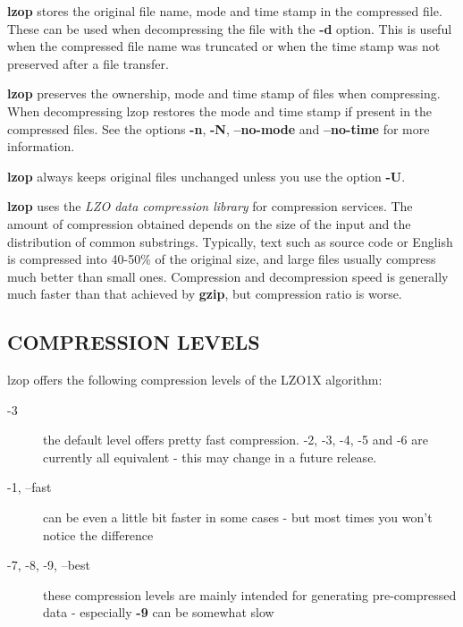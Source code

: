 \textbf{lzop} stores the original file name, mode and time stamp
in the compressed file. These can be used when
decompressing the file with the \textbf{-d} option. This is useful when
the compressed file name was truncated or when the time
stamp was not preserved after a file transfer.



\textbf{lzop} preserves the ownership, mode and time stamp of files
when compressing. When decompressing lzop restores the
mode and time stamp if present in the compressed files.
See the options \textbf{-n}, \textbf{-N}, \textbf{--no-mode} and \textbf{--no-time}
for more information.



\textbf{lzop} always keeps original files unchanged unless
you use the option \textbf{-U}.



\textbf{lzop} uses the \textit{LZO data compression library} for compression
services. The amount of compression obtained depends on
the size of the input and the distribution of common substrings.
Typically, text such as source code or English
is compressed into 40-50\% of the original size, and large files usually
compress much better than small ones. Compression and decompression speed
is generally much faster than that achieved by \textbf{gzip}, but
compression ratio is worse.

\subsection*{COMPRESSION LEVELS\label{COMPRESSION_LEVELS}}


lzop offers the following compression levels of the
LZO1X algorithm:

\begin{description}

\item[{-3}] \mbox{}

the default level offers pretty fast compression.
-2, -3, -4, -5 and -6 are currently all equivalent - this
may change in a future release.


\item[{-1, --fast}] \mbox{}

can be even a little bit faster in some cases - but
most times you won't notice the difference


\item[{-7, -8, -9, --best}] \mbox{}

these compression levels are mainly intended for generating
pre-compressed data - especially \textbf{-9} can be somewhat slow

\end{description}


